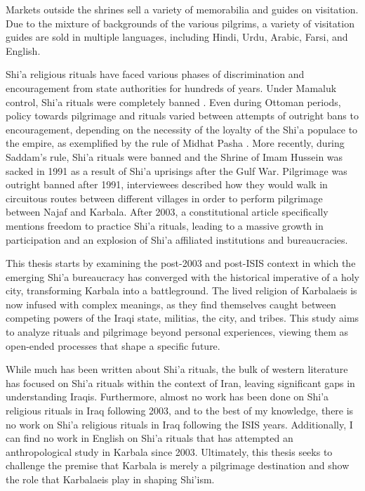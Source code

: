 Markets outside the shrines sell a variety of memorabilia and guides on visitation. Due to the mixture of backgrounds of the various pilgrims, a variety of visitation guides are sold in multiple languages, including Hindi, Urdu, Arabic, Farsi, and English. 

Shi'a religious rituals have faced various phases of discrimination and encouragement from state authorities for hundreds of years. Under Mamaluk control, Shi'a rituals were completely banned \cite{yitzhak_nakash_attempt_1993}. Even during Ottoman periods, policy towards pilgrimage and rituals varied between attempts of outright bans to encouragement, depending on the necessity of the loyalty of the Shi'a populace to the empire, as exemplified by the rule of Midhat Pasha \cite{aghaie_martyrs_2004}. More recently, during Saddam's rule, Shi'a rituals were banned and the Shrine of Imam Hussein was sacked in 1991 as a result of Shi'a uprisings after the Gulf War. Pilgrimage was outright banned after 1991, interviewees described how they would walk in circuitous routes between different villages in order to perform pilgrimage between Najaf and Karbala. After 2003, a constitutional article specifically mentions freedom to practice Shi'a rituals, leading to a massive growth in participation and an explosion of Shi'a affiliated institutions and bureaucracies. 

This thesis starts by examining the post-2003 and post-ISIS context in which the emerging Shi'a bureaucracy has converged with the historical imperative of a holy city, transforming Karbala into a battleground. The lived religion of Karbalaeis is now infused with complex meanings, as they find themselves caught between competing powers of the Iraqi state, militias, the city, and tribes. This study aims to analyze rituals and pilgrimage beyond personal experiences, viewing them as open-ended processes that shape a specific future.

While much has been written about Shi'a rituals, the bulk of western literature has focused on Shi'a rituals within the context of Iran, leaving significant gaps in understanding Iraqis. Furthermore, almost no work has been done on Shi'a religious rituals in Iraq following 2003, and to the best of my knowledge, there is no work on Shi'a religious rituals in Iraq following the ISIS years. Additionally, I can find no work in English on Shi'a rituals that has attempted an anthropological study in Karbala since 2003. Ultimately, this thesis seeks to challenge the premise that Karbala is merely a pilgrimage destination and show the role that Karbalaeis play in shaping Shi'ism. 